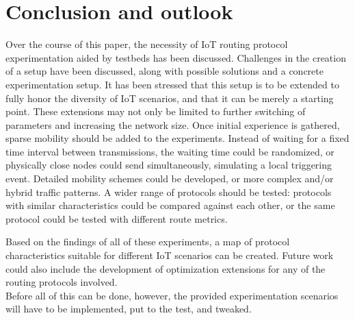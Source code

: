 \documentclass{acm_proc_article-sp}
\begin{document}
\section{Conclusion and outlook}
\label{sec:Conclusion}
Over the course of this paper, the necessity of IoT routing protocol experimentation aided by testbeds has been discussed. Challenges in the creation of a setup have been discussed, along with possible solutions and a concrete experimentation setup. It has been stressed that this setup is to be extended to fully honor the diversity of IoT scenarios, and that it can be merely a starting point. These extensions may not only be limited to further switching of parameters and increasing the network size. Once initial experience is gathered, sparse mobility should be added to the experiments. Instead of waiting for a fixed time interval between transmissions, the waiting time could be randomized, or physically close nodes could send simultaneously, simulating a local triggering event. Detailed mobility schemes could be developed, or more complex and/or hybrid traffic patterns. A wider range of protocols should be tested: protocols with similar characteristics could be compared against each other, or the same protocol could be tested with different route metrics.

Based on the findings of all of these experiments, a map of protocol characteristics suitable for different IoT scenarios can be created. Future work could also include the development of optimization extensions for any of the routing protocols involved.\\
Before all of this can be done, however, the provided experimentation scenarios will have to be implemented, put to the test, and tweaked.



\end{document}
